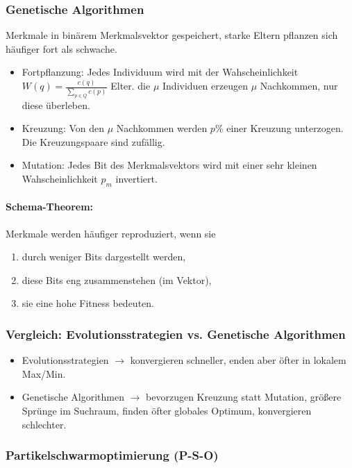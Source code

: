 \subsubsection{Genetische Algorithmen}
Merkmale in binärem Merkmalsvektor gespeichert, starke Eltern pflanzen sich häufiger fort als schwache.

\begin{itemize}
	\item Fortpflanzung: Jedes Individuum wird mit der Wahscheinlichkeit \(W(q) = \frac{c(q)}{\sum\limits_{p \in Q}c(p)}\) Elter. die \(\mu\) Individuen erzeugen \(\mu\) Nachkommen, nur diese überleben.
	\item Kreuzung: Von den \(\mu\) Nachkommen werden \(p\%\) einer Kreuzung unterzogen. Die Kreuzungspaare sind zufällig.
	\item Mutation: Jedes Bit des Merkmalsvektors wird mit einer sehr kleinen Wahscheinlichkeit \(p_m\) invertiert.
\end{itemize}

\paragraph{Schema-Theorem:} Merkmale werden häufiger reproduziert, wenn sie 
\begin{enumerate}
	\item durch weniger Bits dargestellt werden,
	\item diese Bits eng zusammenstehen (im Vektor),
	\item sie eine hohe Fitness bedeuten.
\end{enumerate}

\subsubsection{Vergleich: Evolutionsstrategien vs. Genetische Algorithmen}
\begin{itemize}
	\item Evolutionsstrategien $\rightarrow$ konvergieren schneller, enden aber öfter in lokalem Max/Min.\\
	\item Genetische Algorithmen $\rightarrow$ bevorzugen Kreuzung statt Mutation, größere Sprünge im Suchraum, finden öfter globales Optimum, konvergieren schlechter.
\end{itemize}

\subsubsection{Partikelschwarmoptimierung (P-S-O)}



